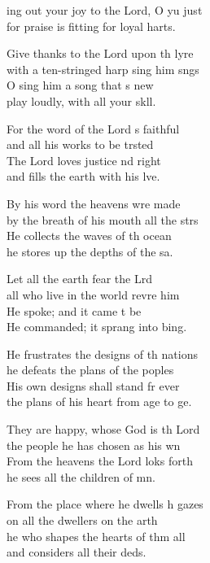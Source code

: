 \begin{psalmverse}
  \begin{patverse}
    ing out your joy to the Lord, O yu just\Med\\
    for praise is fitting for loyal harts.

Give thanks to the Lord upon th lyre\Med\\
    with a ten-stringed harp sing him sngs\\
O sing him a song that \pointup{\i}s new\Med\\
    play loudly, with all your sk\pointup{\i}ll.

For the word of the Lord \pointup{\i}s faithful\Med\\
    and all his works to be trsted\\
The Lord loves justice nd right\Med\\
    and fills the earth with his lve.

By his word the heavens wre made\Med\\
    by the breath of his mouth all the strs\\
He collects the waves of th ocean\Med\\
    he stores up the depths of the sa.

Let all the earth fear the Lrd\Med\\
    all who live in the world revre him\\
He spoke; and it came t be\Med\\
    He commanded; it sprang into bing.

He frustrates the designs of th nations\Med\\
    he defeats the plans of the poples\\
His own designs shall stand fr ever\Med\\
    the plans of his heart from age to ge.

They are happy, whose God is th Lord\Med\\
    the people he has chosen as his wn\\
From the heavens the Lord loks forth\Med\\
    he sees all the children of mn.

From the place where he dwells h gazes\Med\\
    on all the dwellers on the arth\\
he who shapes the hearts of thm all\Med\\
    and considers all their deds.


\end{patverse}
\end{psalmverse}
